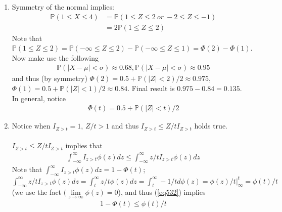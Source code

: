 

\setcounter{theorem}{31}
\begin{exercise}[BH.5.32]
\begin{solution}
    \begin{enumerate}
	    \item Symmetry of the normal implies:
    	\begin{align*}
    		\mathbb{P}\left(1\leq X\leq 4 \right) &= \mathbb{P}\left(1\leq Z\leq 2~\textit{or}~ -2\leq Z\leq -1 \right) \\ 
    		& = 2\mathbb{P}\left(1\leq Z\leq 2\right)
    	\end{align*}
    	Note that $\mathbb{P}\left(1\leq Z\leq 2\right) = \mathbb{P}\left(-\infty\leq Z\leq 2\right) - \mathbb{P}\left(-\infty\leq Z\leq 1\right)=\Phi(2)-\Phi(1)$. Now make use the following 
    	\begin{align*}
    		\mathbb{P}\left(|X-\mu|<\sigma \right) \approx 0.68, 	\mathbb{P}\left(|X-\mu|<\sigma \right) \approx 0.95
    	\end{align*}
    	and thus (by symmetry) $\Phi(2) = 0.5 + \mathbb{P}\left(|Z|<2\right)/2 \approx 0.975$,
    	$\Phi(1) = 0.5 + \mathbb{P}\left(|Z|<1\right)/2 \approx 0.84$. Final result is $0.975-0.84=0.135$.\\
    	
    	\noindent In general, notice 
    	\begin{align*}
    		\Phi(t)=0.5+ \mathbb{P}\left(|Z|<t\right)/2  
    	\end{align*}
     \item   Notice when $I_{Z>t}=1$, $Z/t>1$ and thus $I_{Z>t}\leq Z/t I_{Z>t}$ holds true. \\~\\
    	$I_{Z>t}\leq Z/t I_{Z>t}$ implies that 
    	\begin{align}
    		\int_{-\infty}^{\infty}I_{z>t} \phi(z) dz \leq 	\int_{-\infty}^{\infty}z/tI_{z>t} \phi(z) dz  \label{eq532} 
    	\end{align}
    	Note that $	\int_{-\infty}^{\infty}I_{z>t} \phi(z) dz = 1-\Phi(t)$;~ $\int_{-\infty}^{\infty}z/tI_{z>t} \phi(z) dz = \int_{t}^{\infty}z/t \phi(z) dz = \int_{t}^{\infty}  -1/td\phi(z)=\phi(z)/t|^t_\infty= \phi(t)/t$ (we use the fact $(\lim\limits_{z\rightarrow \infty}\phi(z)=0$), and thus (\ref{eq532}) implies 
    	\begin{align*}
    		1-\Phi(t) \leq \phi(t)/t
    	\end{align*}
	\end{enumerate}
\end{solution}
\end{exercise}


